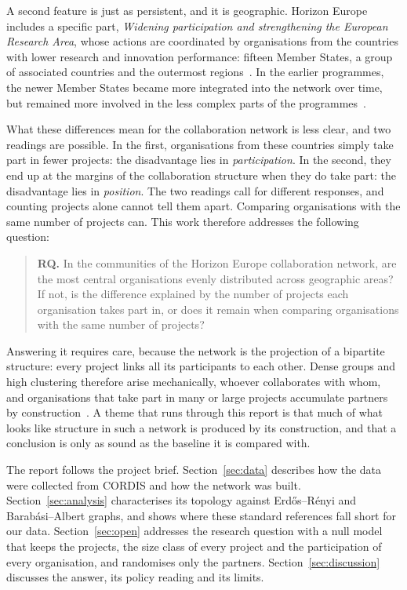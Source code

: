 \documentclass[sigchi]{acmart}
\begin{document}
A second feature is just as persistent, and it is geographic. Horizon Europe includes a specific part, \emph{Widening participation and strengthening the European Research Area}, whose actions are coordinated by organisations from the countries with lower research and innovation performance: fifteen Member States, a group of associated countries and the outermost regions~\cite{regulation,widening}. In the earlier programmes, the newer Member States became more integrated into the network over time, but remained more involved in the less complex parts of the programmes~\cite{balland2019}.

What these differences mean for the collaboration network is less clear, and two readings are possible. In the first, organisations from these countries simply take part in fewer projects: the disadvantage lies in \emph{participation}. In the second, they end up at the margins of the collaboration structure when they do take part: the disadvantage lies in \emph{position}. The two readings call for different responses, and counting projects alone cannot tell them apart. Comparing organisations with the same number of projects can. This work therefore addresses the following question:

\begin{quote}
\textbf{RQ.} In the communities of the Horizon Europe collaboration network, are the most central organisations evenly distributed across geographic areas? If not, is the difference explained by the number of projects each organisation takes part in, or does it remain when comparing organisations with the same number of projects?
\end{quote}

Answering it requires care, because the network is the projection of a bipartite structure: every project links all its participants to each other. Dense groups and high clustering therefore arise mechanically, whoever collaborates with whom, and organisations that take part in many or large projects accumulate partners by construction~\cite{newman2001,opsahl2013}. A theme that runs through this report is that much of what looks like structure in such a network is produced by its construction, and that a conclusion is only as sound as the baseline it is compared with.

The report follows the project brief. Section~\ref{sec:data} describes how the data were collected from CORDIS and how the network was built. Section~\ref{sec:analysis} characterises its topology against Erd\H{o}s--R\'enyi and Barab\'asi--Albert graphs, and shows where these standard references fall short for our data. Section~\ref{sec:open} addresses the research question with a null model that keeps the projects, the size class of every project and the participation of every organisation, and randomises only the partners. Section~\ref{sec:discussion} discusses the answer, its policy reading and its limits.
\end{document}
